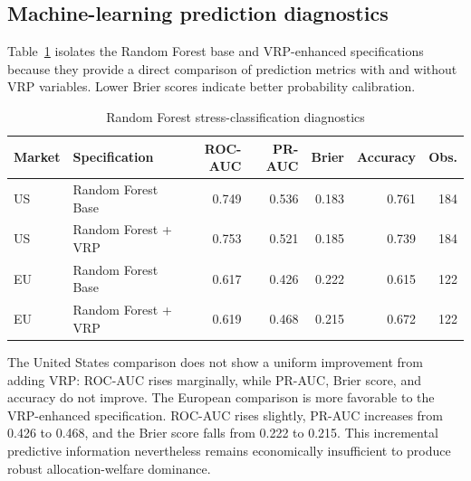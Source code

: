 \subsection{Machine-learning prediction diagnostics}

Table~\ref{tab:appendix_ml_diagnostics} isolates the Random Forest base and VRP-enhanced specifications because they provide a direct comparison of prediction metrics with and without VRP variables. Lower Brier scores indicate better probability calibration.

\begin{table}[H]
\centering
\caption{Random Forest stress-classification diagnostics}
\label{tab:appendix_ml_diagnostics}
\small
\begin{tabular}{llrrrrr}
\toprule
Market & Specification & ROC-AUC & PR-AUC & Brier & Accuracy & Obs. \\
\midrule
US & Random Forest Base & 0.749 & 0.536 & 0.183 & 0.761 & 184 \\
US & Random Forest + VRP & 0.753 & 0.521 & 0.185 & 0.739 & 184 \\
EU & Random Forest Base & 0.617 & 0.426 & 0.222 & 0.615 & 122 \\
EU & Random Forest + VRP & 0.619 & 0.468 & 0.215 & 0.672 & 122 \\
\bottomrule
\end{tabular}
\end{table}

The United States comparison does not show a uniform improvement from adding VRP: ROC-AUC rises marginally, while PR-AUC, Brier score, and accuracy do not improve. The European comparison is more favorable to the VRP-enhanced specification. ROC-AUC rises slightly, PR-AUC increases from 0.426 to 0.468, and the Brier score falls from 0.222 to 0.215. This incremental predictive information nevertheless remains economically insufficient to produce robust allocation-welfare dominance.
